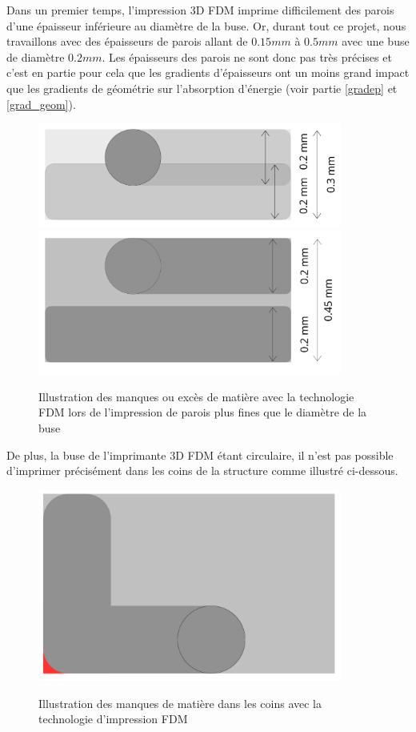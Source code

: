 \documentclass[a4paper]{article}
\begin{document}
	Dans un premier temps, l'impression 3D FDM imprime difficilement des parois d'une épaisseur inférieure au diamètre de la buse. Or, durant tout ce projet, nous travaillons avec des épaisseurs de parois allant de $0.15 mm$ à $0.5 mm$ avec une buse de diamètre $0.2 mm$. Les épaisseurs des parois ne sont donc pas très précises et c'est en partie pour cela que les gradients d'épaisseurs ont un moins grand impact que les gradients de géométrie sur l'absorption d'énergie (voir partie \ref{gradep} et \ref{grad_geom}).
	
	\begin{figure}[H]
		\centering
		\includegraphics[width=10cm, angle=-90]{Images/9/0.3mm.pdf}
		\includegraphics[width=10cm, angle=-90]{Images/9/0.45mm.pdf}\\
		\caption{Illustration des manques ou excès de matière avec la technologie FDM lors de l'impression de parois plus fines que le diamètre de la buse}
	\end{figure}
	\newpage
	
	De plus, la buse de l'imprimante 3D FDM étant circulaire, il n'est pas possible d'imprimer précisément dans les coins de la structure comme illustré ci-dessous.
	
	\begin{figure}[H]
		\centering
		\includegraphics[width=10cm]{Images/9/trou.pdf}\\
		\caption{Illustration des manques de matière dans les coins avec la technologie d'impression FDM}
	\end{figure}
	
\end{document}
